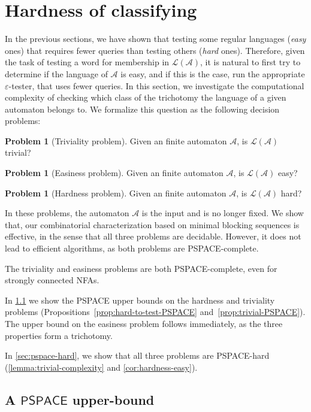 \documentclass[letterpaper, USenglish, cleveref, autoref, thm-restate, numberwithinsect]{lipics-v2021}
\theoremstyle{theorem}
\theoremstyle{definition}
\newtheorem{problem}[theorem]{Problem}
\newcommand{\Aa}{\mathcal{A}}
\newcommand{\eps}{\varepsilon}
\newcommand{\lang}[1]{\mathcal{L}(#1)}
\newcommand{\PSPACE}{\textsf{PSPACE}\xspace}
\begin{document}
\section{Hardness of classifying}
\label{sec:complexity}
In the previous sections, we have shown that testing some regular languages (\emph{easy} ones) that requires fewer queries than testing others (\emph{hard} ones).
Therefore, given the task of testing a word for membership in $\lang{\Aa}$,
it is natural to first try to determine if the language of $\Aa$ is easy, and if this is the case, run the appropriate $\eps$-tester, that uses fewer queries.
In this section, we investigate the computational complexity of checking which class of the trichotomy the language of a given automaton belongs to.
We formalize this question as the following decision problems:

\begin{problem}[Triviality problem]
	Given an finite automaton $\Aa$, is $\lang{\Aa}$ trivial?
\end{problem}
\begin{problem}[Easiness problem]
	Given an finite automaton $\Aa$, is $\lang{\Aa}$ easy?
\end{problem}
\begin{problem}[Hardness problem]
	Given an finite automaton $\Aa$, is $\lang{\Aa}$ hard?
\end{problem}

In these problems, the automaton $\Aa$ is the input and is no longer fixed.
We show that, our combinatorial characterization based on minimal blocking sequences is effective, in the sense that all three problems are decidable. However, it does not lead to efficient algorithms, as both problems are \PSPACE-complete.

\begin{theorem}\label{thm:PSPACE-main}
	The triviality and easiness problems are both \PSPACE-complete, even for strongly connected NFAs.
\end{theorem}

In \cref{sec:ppace-ub} we show the \PSPACE upper bounds on the hardness and triviality problems (Propositions~\ref{prop:hard-to-test-PSPACE} and~\ref{prop:trivial-PSPACE}). The upper bound on the easiness problem follows immediately, as the three properties form a trichotomy.

In \cref{sec:pspace-hard}, we show that all three problems are \PSPACE-hard (\cref{lemma:trivial-complexity} and \cref{cor:hardness-easy}).

\subsection{A $\PSPACE$ upper-bound}\label{sec:ppace-ub}
\end{document}
